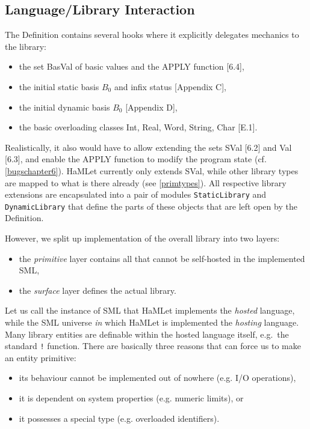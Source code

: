 \documentclass[twoside,titlepage]{article}
\begin{document}
\subsection{Language/Library Interaction}
\label{libhooks}

The Definition contains several hooks where it explicitly delegates mechanics to the library:

\begin{itemize}[nolistsep]
\item the set BasVal of basic values and the APPLY function [6.4],
\item the initial static basis $B_0$ and infix status [Appendix C],
\item the initial dynamic basis $B_0$ [Appendix D],
\item the basic overloading classes Int, Real, Word, String, Char [E.1].
\end{itemize}

Realistically, it also would have to allow extending the sets SVal [6.2] and Val [6.3], and enable the APPLY function to modify the program state (cf. \ref{bugschapter6}). HaMLet currently only extends SVal, while other library types are mapped to what is there already (see \ref{primtypes}).
%
All respective library extensions are encapsulated into a pair of modules {\tt StaticLibrary} and {\tt DynamicLibrary} that define the parts of these objects that are left open by the Definition.

However, we split up implementation of the overall library into two layers:

\begin{itemize}[nolistsep]
\item the {\em primitive} layer contains all that cannot be self-hosted in the implemented SML,
\item the {\em surface} layer defines the actual library.
\end{itemize}

Let us call the instance of SML that HaMLet implements the {\it hosted} language, while the SML universe {\em in} which HaMLet is implemented the {\it hosting} language.
Many library entities are definable within the hosted language itself, e.g.\ the standard {\tt !} function. There are basically three reasons that can force us to make an entity primitive:

\begin{itemize}[nolistsep]
\item its behaviour cannot be implemented out of nowhere (e.g. I/O operations),
\item it is dependent on system properties (e.g. numeric limits), or
\item it possesses a special type (e.g. overloaded identifiers).
\end{itemize}
\end{document}
